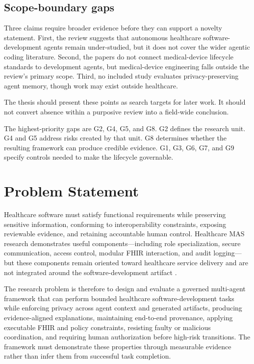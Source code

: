 \documentclass[11pt,a4paper]{article}
\begin{document}
\subsection{Scope-boundary gaps}

Three claims require broader evidence before they can support a novelty statement. First, the review suggests that autonomous healthcare software-development agents remain under-studied, but it does not cover the wider agentic coding literature. Second, the papers do not connect medical-device lifecycle standards to development agents, but medical-device engineering falls outside the review's primary scope. Third, no included study evaluates privacy-preserving agent memory, though work may exist outside healthcare.

The thesis should present these points as search targets for later work. It should not convert absence within a purposive review into a field-wide conclusion.

The highest-priority gaps are G2, G4, G5, and G8. G2 defines the research unit. G4 and G5 address risks created by that unit. G8 determines whether the resulting framework can produce credible evidence. G1, G3, G6, G7, and G9 specify controls needed to make the lifecycle governable.

\section{Problem Statement}

Healthcare software must satisfy functional requirements while preserving sensitive information, conforming to interoperability constraints, exposing reviewable evidence, and retaining accountable human control. Healthcare MAS research demonstrates useful components---including role specialization, secure communication, access control, modular FHIR interaction, and audit logging---but these components remain oriented toward healthcare service delivery and are not integrated around the software-development artifact \cite{khan2019ibac,naresh2020quantum,demaio2025privacy,shehab2025agentic}.

The research problem is therefore to design and evaluate a governed multi-agent framework that can perform bounded healthcare software-development tasks while enforcing privacy across agent context and generated artifacts, producing evidence-aligned explanations, maintaining end-to-end provenance, applying executable FHIR and policy constraints, resisting faulty or malicious coordination, and requiring human authorization before high-risk transitions. The framework must demonstrate these properties through measurable evidence rather than infer them from successful task completion.
\end{document}
